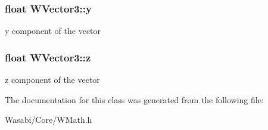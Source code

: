 \subsubsection[{\texorpdfstring{y}{y}}]{\setlength{\rightskip}{0pt plus 5cm}float W\+Vector3\+::y}\hypertarget{class_w_vector3_a2e4d4970827cd3c2bc17ae995b648b08}{}\label{class_w_vector3_a2e4d4970827cd3c2bc17ae995b648b08}
y component of the vector 
\subsubsection[{\texorpdfstring{z}{z}}]{\setlength{\rightskip}{0pt plus 5cm}float W\+Vector3\+::z}\hypertarget{class_w_vector3_ac90f9885ea33f3f7adfc062c556dc191}{}\label{class_w_vector3_ac90f9885ea33f3f7adfc062c556dc191}
z component of the vector 

The documentation for this class was generated from the following file\+:\begin{DoxyCompactItemize}
\item 
Wasabi/\+Core/W\+Math.\+h\end{DoxyCompactItemize}
